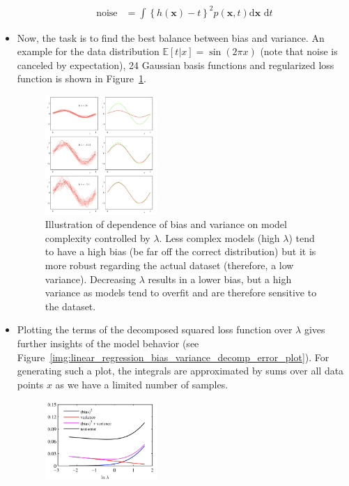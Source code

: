 \begin{itemize}
\begin{equation*}
\begin{split}
			\text{noise} &= \int \left\{h(\bm{x})-t\right\}^2p\left(\bm{x},t\right)\text{d}\bm{x}\text{ d}t
		\end{split}
	\end{equation*}
	\item Now, the task is to find the best balance between bias and variance. An example for the data distribution $\mathbb{E}[t|x]=\sin(2\pi x)$ (note that noise is canceled by expectation), 24 Gaussian basis functions and regularized loss function is shown in Figure~\ref{img:linear_regression_bias_variance_decomp_example}.
	\begin{figure}[ht]
		\centering
		\includegraphics[width=0.4\textwidth]{figures/bias_variance_reg_comp.png}
		\caption{Illustration of dependence of bias and variance on model complexity controlled by $\lambda$. Less complex models (high $\lambda$) tend to have a high bias (be far off the correct distribution) but it is more robust regarding the actual dataset (therefore, a low variance). Decreasing $\lambda$ results in a lower bias, but a high variance as models tend to overfit and are therefore sensitive to the dataset.}
		\label{img:linear_regression_bias_variance_decomp_example}
	\end{figure}
	\item Plotting the terms of the decomposed squared loss function over $\lambda$ gives further insights of the model behavior (see Figure~\ref{img:linear_regression_bias_variance_decomp_error_plot}). For generating such a plot, the integrals are approximated by sums over all data points $x$ as we have a limited number of samples.
	\begin{figure}[ht]
		\centering
		\includegraphics[width=0.4\textwidth]{figures/bias_variance_loss_plot.png}

\end{figure}
\end{itemize}
